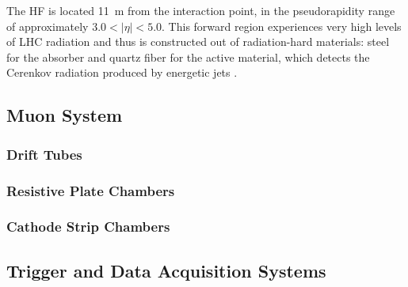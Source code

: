 The HF is located 11~m from the interaction point, in the pseudorapidity range of approximately $3.0 < |\eta| < 5.0$. This forward region experiences very high levels of LHC radiation and thus is constructed out of radiation-hard materials: steel for the absorber and quartz fiber for the active material, which detects the Cerenkov radiation produced by energetic jets \cite{CERN-LHCC-97-031, Penzo2009}.

\subsection{Muon System}
\subsubsection{Drift Tubes}
\subsubsection{Resistive Plate Chambers}
\subsubsection{Cathode Strip Chambers}

\subsection{Trigger and Data Acquisition Systems}
